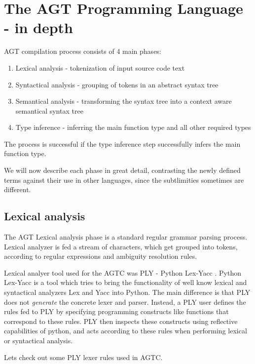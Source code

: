 \documentclass[times, utf8, diplomski]{fer}
\theoremstyle{definition}
\begin{document}
\chapter{The AGT Programming Language - in depth}

AGT compilation process consists of 4 main phases: 

\begin{enumerate}
\item Lexical analysis - tokenization of input source code text
\item Syntactical analysis - grouping of tokens in an abstract syntax tree
\item Semantical analysis - transforming the syntax tree into a context aware semantical syntax tree
\item Type inference - inferring the main function type and all other required types
\end{enumerate}

The process is successful if the type inference step successfully infers the main function type.

We will now describe each phase in great detail, contrasting the newly defined terms
against their use in other languages, since the subtlimities sometimes are different.

\section{Lexical analysis}

The AGT Lexical analysis phase is a standard regular grammar parsing process.
Lexical analyzer is fed a stream of characters, which get grouped into tokens,
according to regular expressions and ambiguity resolution rules.

Lexical analyer tool used for the AGTC was PLY - Python Lex-Yacc \citep{c_ply_beazley}.
Python Lex-Yacc is a tool which tries to bring the functionality of well know lexical and syntactical
analyzers Lex and Yacc into Python. The main difference is that PLY does not \textit{generate} the 
concrete lexer and parser. Instead, a PLY user defines the rules fed to PLY by specifying programming 
constructs like functions that correspond to these rules. PLY then inspects these constructs using 
reflective capabilities of python, and acts according to these rules
when performing lexical or syntactical analysis.

Lets check out some PLY lexer rules used in AGTC.


\end{document}
